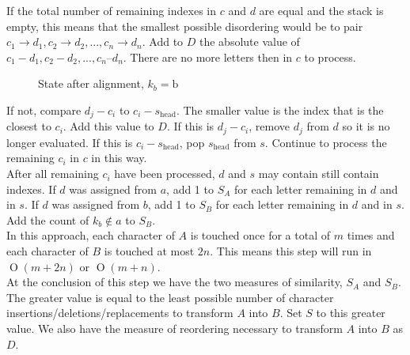 \documentclass[10pt]{article}
\newcommand{\bigO}[1]{\ensuremath{\operatorname{O}\left(#1\right)}}
\begin{document}
  If the total number of remaining indexes in $c$ and $d$ are equal and the stack is empty, this means that the smallest possible disordering would be to pair $c_1\rightarrow d_1, c_2\rightarrow d_2, ..., c_n\rightarrow d_n$.  Add to $D$ the absolute value of $c_1-d_1,c_2-d_2, ..., c_n – d_n$. There are no more letters then in $c$ to process.\\[2ex]
  \begin{figure}
    \centering
    \caption{State after alignment, $k_b=\text{b}$}
    
  \end{figure}
  If not, compare $d_j-c_i$ to $c_i-s_{\text{head}}$.  The smaller value is the index that is the closest to $c_i$.  Add this value to $D$.  If this is $d_j-c_i$, remove $d_j$ from $d$ so it is no longer evaluated.  If this is $c_i-s_{\text{head}}$, pop $s_{\text{head}}$ from $s$.  Continue to process the remaining $c_i$ in $c$ in this way.\\[2ex]
  After all remaining $c_i$ have been processed, $d$ and $s$ may contain still contain indexes.  If $d$ was assigned from $a$, add 1 to $S_A$ for each letter remaining in $d$ and in $s$.    If $d$ was assigned from $b$, add 1 to $S_B$ for each letter remaining in $d$ and in $s$.\\[2ex]

  Add the count of $k_b \notin a$ to $S_B$.\\[2ex]
  In this approach, each character of $A$ is touched once for a total of $m$ times and each character of $B$ is touched at most $2n$.  This means this step will run in \bigO{m+2n} or \bigO{m+n}.\\[2ex]
  At the conclusion of this step we have the two measures of similarity, $S_A$ and $S_B$.  The greater value is equal to the least possible number of character insertions/deletions/replacements to transform $A$ into $B$.  Set $S$ to this greater value.  We also have the measure of reordering necessary to transform $A$ into $B$ as $D$.
  
\end{document}
